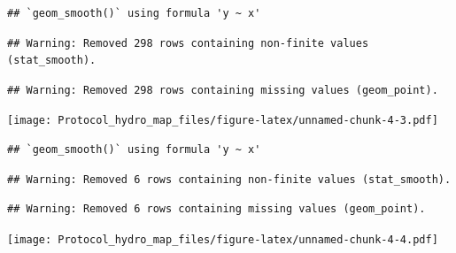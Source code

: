 \documentclass[]{article}
\newenvironment{Shaded}{\begin{snugshade}}{\end{snugshade}}
\newcommand{\KeywordTok}[1]{\textcolor[rgb]{0.13,0.29,0.53}{\textbf{#1}}}
\newcommand{\DataTypeTok}[1]{\textcolor[rgb]{0.13,0.29,0.53}{#1}}
\newcommand{\StringTok}[1]{\textcolor[rgb]{0.31,0.60,0.02}{#1}}
\newcommand{\OperatorTok}[1]{\textcolor[rgb]{0.81,0.36,0.00}{\textbf{#1}}}
\newcommand{\NormalTok}[1]{#1}
\begin{document}
\begin{verbatim}
## `geom_smooth()` using formula 'y ~ x'
\end{verbatim}

\begin{verbatim}
## Warning: Removed 298 rows containing non-finite values (stat_smooth).
\end{verbatim}

\begin{verbatim}
## Warning: Removed 298 rows containing missing values (geom_point).
\end{verbatim}

\texttt{[image: Protocol\_hydro\_map\_files/figure-latex/unnamed-chunk-4-3.pdf]}

\begin{Shaded}
\end{Shaded}

\begin{verbatim}
## `geom_smooth()` using formula 'y ~ x'
\end{verbatim}

\begin{verbatim}
## Warning: Removed 6 rows containing non-finite values (stat_smooth).
\end{verbatim}

\begin{verbatim}
## Warning: Removed 6 rows containing missing values (geom_point).
\end{verbatim}

\texttt{[image: Protocol\_hydro\_map\_files/figure-latex/unnamed-chunk-4-4.pdf]}
\end{document}
